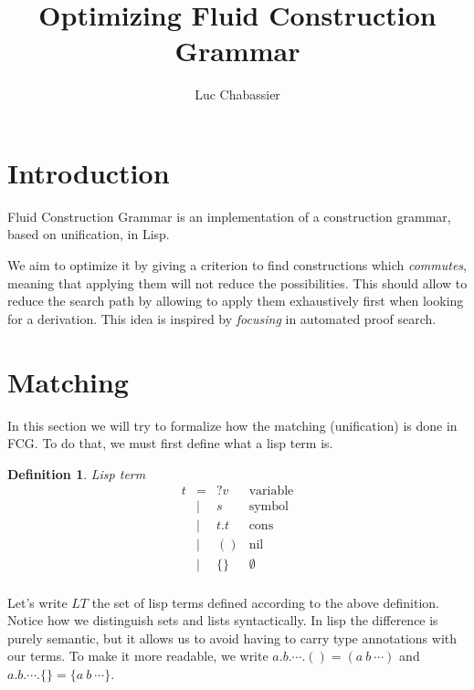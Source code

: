 \documentclass[]{article}
\newcommand{\1}{\mathbbm{1}}
\newcommand{\0}{\mathbbm{0}}
\newtheorem{defi}{Definition}
\begin{document}
\title{Optimizing Fluid Construction Grammar}
\author{Luc Chabassier}
\maketitle

\section{Introduction}

Fluid Construction Grammar is an implementation of a construction grammar,
based on unification, in Lisp.

We aim to optimize it by giving a criterion to find constructions which
\emph{commutes}, meaning that applying them will not reduce the possibilities.
This should allow to reduce the search path by allowing to apply them
exhaustively first when looking for a derivation. This idea is inspired by
\emph{focusing} in automated proof search.

\section{Matching}

In this section we will try to formalize how the matching (unification) is done
in FCG. To do that, we must first define what a lisp term is.

\begin{defi}{Lisp term}
    \[\begin{array}{rcll}
        t & = & ?v    & \text{variable} \\
          & | & s     & \text{symbol}   \\
          & | & t . t & \text{cons}     \\
          & | & ()    & \text{nil}      \\
          & | & \{\}  & \emptyset       \\
    \end{array}\]
\end{defi}

Let's write $LT$ the set of lisp terms defined according to the above
definition. Notice how we distinguish sets and lists syntactically.
In lisp the difference is purely semantic, but it allows us to avoid
having to carry type annotations with our terms. To make it more
readable, we write $a.b.\cdots.() = (a\ b\ \cdots)$ and
$a.b.\cdots.\{\} = \{a\ b\ \cdots\}$.
\end{document}
